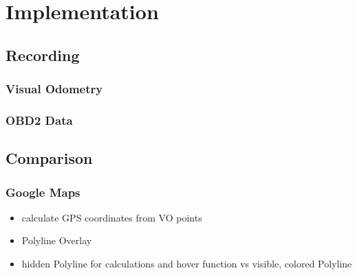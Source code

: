 \section{Implementation}
\label{sec:implementation}

\subsection{Recording}
\subsubsection{Visual Odometry}
\subsubsection{OBD2 Data}

\subsection{Comparison}
\subsubsection{Google Maps}
\begin{itemize}
	\item calculate GPS coordinates from VO points
	\item Polyline Overlay
	\item hidden Polyline for calculations and hover function vs visible, colored Polyline	
\end{itemize}